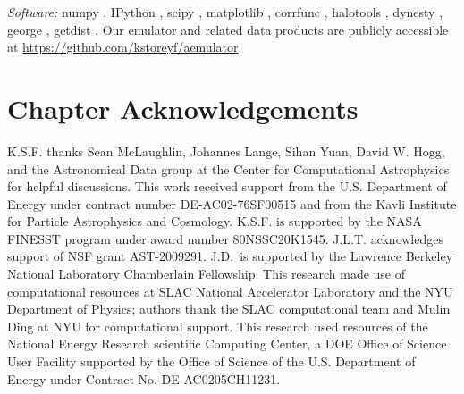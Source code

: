 \textit{Software:} numpy \citep{VanDerWalt2011}, IPython \citep{Perez2007}, scipy \citep{Virtanen2020}, matplotlib \citep{Hunter2007}, corrfunc \citep{SinhaGarrison2019, Sinha2020}, halotools \citep{Hearin2017}, dynesty \citep{Speagle2020}, george \citep{Ambikasaran2016}, getdist \citep{Lewis2019}.
Our emulator and related data products are publicly accessible at \url{https://github.com/kstoreyf/aemulator}.

\section{Chapter Acknowledgements}

K.S.F. thanks Sean McLaughlin, Johannes Lange, Sihan Yuan, David W. Hogg, and the Astronomical Data group at the Center for Computational Astrophysics for helpful discussions.
This work received support from the U.S. Department of Energy under contract number DE-AC02-76SF00515 and from the Kavli Institute for Particle Astrophysics and Cosmology.
K.S.F. is supported by the NASA FINESST program under award number 80NSSC20K1545.
J.L.T. acknowledges support of NSF grant AST-2009291.
J.D.~is supported by the Lawrence Berkeley National Laboratory Chamberlain Fellowship.
This research made use of computational resources at SLAC National Accelerator Laboratory and the NYU Department of Physics; authors thank the SLAC computational team and Mulin Ding at NYU for computational support.
This research used resources of the National Energy Research scientific Computing Center, a DOE Office of Science User Facility supported by the Office of Science of the U.S. Department of Energy under Contract No. DE-AC0205CH11231.


